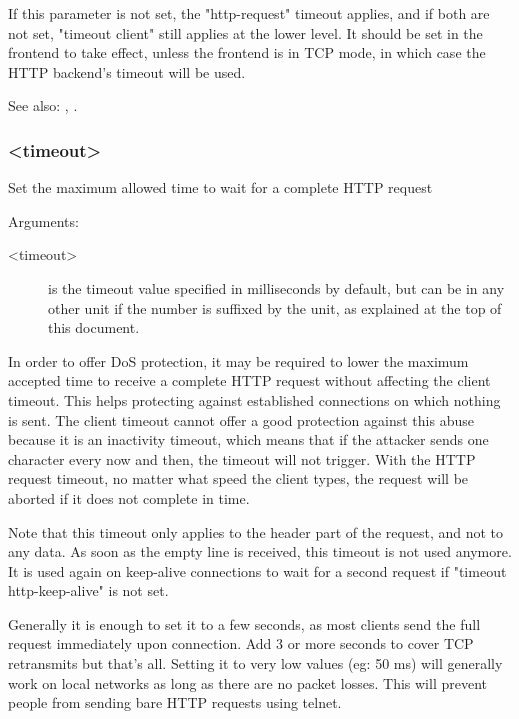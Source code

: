   If this parameter is not set, the "http-request" timeout applies, and if both
  are not set, "timeout client" still applies at the lower level. It should be
  set in the frontend to take effect, unless the frontend is in TCP mode, in
  which case the HTTP backend's timeout will be used.


See also: , .

\subsubsection[timeout http-request]{ <timeout>}

  Set the maximum allowed time to wait for a complete HTTP request


  Arguments:
  \begin{description}
  \item[<timeout>] is the timeout value specified in milliseconds by default, but
              can be in any other unit if the number is suffixed by the unit,
              as explained at the top of this document.
  \end{description}

  In order to offer DoS protection, it may be required to lower the maximum
  accepted time to receive a complete HTTP request without affecting the client
  timeout. This helps protecting against established connections on which
  nothing is sent. The client timeout cannot offer a good protection against
  this abuse because it is an inactivity timeout, which means that if the
  attacker sends one character every now and then, the timeout will not
  trigger. With the HTTP request timeout, no matter what speed the client
  types, the request will be aborted if it does not complete in time.

  Note that this timeout only applies to the header part of the request, and
  not to any data. As soon as the empty line is received, this timeout is not
  used anymore. It is used again on keep-alive connections to wait for a second
  request if "timeout http-keep-alive" is not set.

  Generally it is enough to set it to a few seconds, as most clients send the
  full request immediately upon connection. Add 3 or more seconds to cover TCP
  retransmits but that's all. Setting it to very low values (eg: 50 ms) will
  generally work on local networks as long as there are no packet losses. This
  will prevent people from sending bare HTTP requests using telnet.

